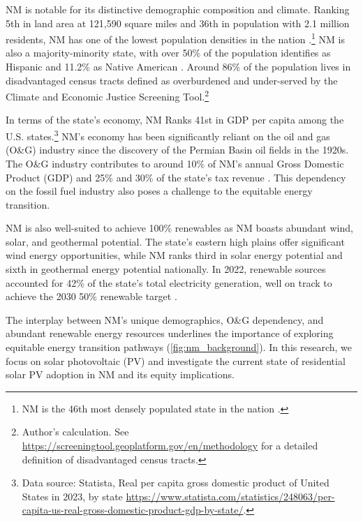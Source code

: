 \documentclass[12pt,twoside,letterpaper]{article}
\begin{document}
NM is notable for its distinctive demographic composition and climate. Ranking 5th in land area at 121,590 square miles and 36th in population with 2.1 million residents, NM has one of the lowest population densities in the nation \parencite{uscensus2022}.\footnote{NM is the 46th most densely populated state in the nation \parencite{uscensus2022}.} NM is also a majority-minority state, with over 50\% of the population identifies as Hispanic and 11.2\% as Native American \parencite{uscensus2020}.  Around 86\% of the population lives in disadvantaged census tracts defined as overburdened and under-served by the Climate and Economic Justice Screening Tool.\footnote{Author's calculation. See \url{https://screeningtool.geoplatform.gov/en/methodology} for a detailed definition of disadvantaged census tracts.} 

In terms of the state's economy, NM Ranks 41st in GDP per capita among the U.S. states.\footnote{Data source: Statista, Real per capita gross domestic product of United States in 2023, by state \url{https://www.statista.com/statistics/248063/per-capita-us-real-gross-domestic-product-gdp-by-state/}.} NM's economy has been significantly reliant on the oil and gas (O\&G) industry since the discovery of the Permian Basin oil fields in the 1920s. The O\&G industry contributes to around 10\% of NM's annual Gross Domestic Product (GDP) and 25\% and 30\% of the state's tax revenue \parencite{eia2023nm, nmlegislative2023}. This dependency on the fossil fuel industry also poses a challenge to the equitable energy transition.

NM is also well-suited to achieve 100\% renewables as NM boasts abundant wind, solar, and geothermal potential. The state's eastern high plains offer significant wind energy opportunities, while NM ranks third in solar energy potential and sixth in geothermal energy potential nationally. In 2022, renewable sources accounted for 42\% of the state's total electricity generation, well on track to achieve the 2030 50\% renewable target \parencite{eia2023energy}.

The interplay between NM's unique demographics, O\&G dependency, and abundant renewable energy resources underlines the importance of exploring equitable energy transition pathways (\autoref{fig:nm_background}). In this research, we focus on solar photovoltaic (PV) and investigate the current state of residential solar PV adoption in NM and its equity implications. 
\end{document}
